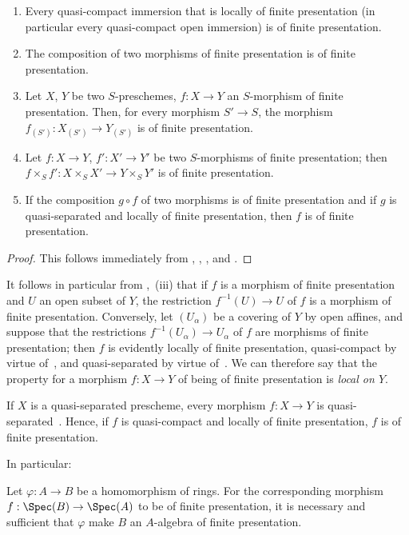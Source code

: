 \begin{proposition}[1.6.2]
\label{IV.1.6.2}
\begin{enumerate}
  \item[\rm(i)] Every quasi-compact immersion that is locally of finite presentation (in particular every quasi-compact open immersion) is of finite presentation.
  \item[\rm(ii)] The composition of two morphisms of finite presentation is of finite presentation.
  \item[\rm(iii)] Let $X$, $Y$ be two $S$-preschemes, $f:X\to Y$ an $S$-morphism of finite presentation.
  Then, for every morphism $S'\to S$, the morphism $f_{(S')}:X_{(S')}\to Y_{(S')}$ is of finite presentation.
  \item[\rm(iv)] Let $f:X\to Y$, $f':X'\to Y'$ be two $S$-morphisms of finite presentation; then $f\times_S f':X\times_S X'\to Y\times_S Y'$ is of finite presentation.
  \item[\rm(v)] If the composition $g\circ f$ of two morphisms is of finite presentation and if $g$ is quasi-separated and locally of finite presentation, then $f$ is of finite presentation.
\end{enumerate}
\end{proposition}

\begin{proof}
This follows immediately from , , , and .
\end{proof}

It follows in particular from ,~(iii) that if $f$ is a morphism of finite presentation and $U$ an open subset of $Y$, the restriction $f^{-1}(U)\to U$ of $f$ is a morphism of finite presentation.
Conversely, let $(U_\alpha)$ be a covering of $Y$ by open affines, and suppose that the restrictions $f^{-1}(U_\alpha)\to U_\alpha$ of $f$ are morphisms of finite presentation; then $f$ is evidently locally of finite presentation, quasi-compact by virtue of~, and quasi-separated by virtue of~.
We can therefore say that the property for a morphism $f:X\to Y$ of being of finite presentation is \emph{local on $Y$}.

If $X$ is a quasi-separated prescheme, every morphism $f:X\to Y$ is quasi-separated~.
Hence, if $f$ is quasi-compact and locally of finite presentation, $f$ is of finite presentation.

In particular:

\begin{corollary}[1.6.3]
\label{IV.1.6.3}
Let $\varphi:A\to B$ be a homomorphism of rings.
For the corresponding morphism $f:\Spec(B)\to\Spec(A)$ to be of finite presentation, it is necessary and sufficient that $\varphi$ make $B$ an $A$-algebra of finite presentation.
\end{corollary}


